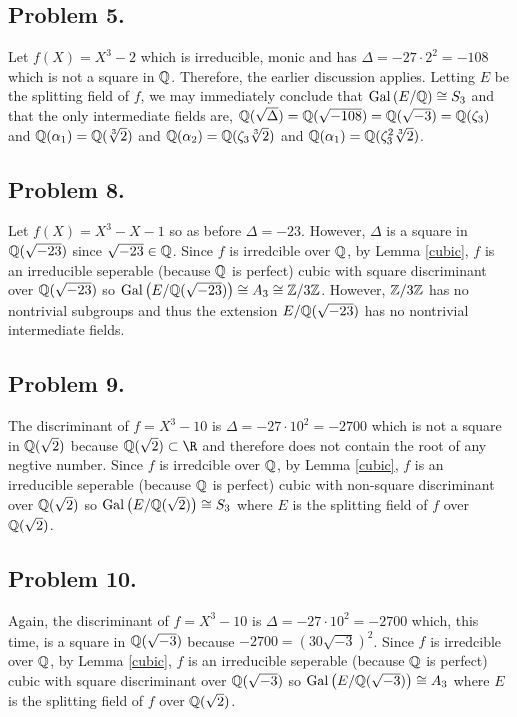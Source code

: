 \documentclass[12pt]{extarticle}
\begin{document}
 
\subsection*{Problem 5.}

Let $f(X) = X^3 - 2$ which is irreducible, monic and has $\Delta = -27 \cdot 2^2 = -108$ which is not a square in $\mathbb{Q}$. Therefore, the earlier discussion applies. Letting $E$ be the splitting field of $f$, we may immediately conclude that $\mathrm{Gal}\left( E/\mathbb{Q} \right) \cong S_3$ and that the only intermediate fields are, $\mathbb{Q}(\sqrt{\Delta}) = \mathbb{Q}(\sqrt{-108}) = \mathbb{Q}(\sqrt{-3}) = \mathbb{Q}(\zeta_3)$ and $\mathbb{Q}(\alpha_1) = \mathbb{Q}(\sqrt[3]{2})$ and $\mathbb{Q}(\alpha_2) = \mathbb{Q}(\zeta_3 \sqrt[3]{2})$ and $\mathbb{Q}(\alpha_1) = \mathbb{Q}(\zeta_3^2 \sqrt[3]{2})$.

\subsection*{Problem 8.}
Let $f(X) = X^3 - X - 1$ so as before $\Delta = -23$. However, $\Delta$ is a square in $\mathbb{Q}(\sqrt{-23})$ since $\sqrt{-23} \in \mathbb{Q}$. Since $f$ is irredcible over $\mathbb{Q}$, by Lemma \ref{cubic}, $f$ is an irreducible seperable (because $\mathbb{Q}$ is perfect) cubic with square discriminant over $\mathbb{Q}(\sqrt{-23})$ so $\mathrm{Gal}\left( E/\mathbb{Q}(\sqrt{-23}) \right) \cong A_3 \cong \mathbb{Z}/3\mathbb{Z}$. However, $\mathbb{Z}/3\mathbb{Z}$ has no nontrivial subgroups and thus the extension $E/\mathbb{Q}(\sqrt{-23})$ has no nontrivial intermediate fields.


\subsection*{Problem 9.}
The discriminant of $f = X^3 - 10$ is $\Delta = -27 \cdot 10^2 = -2700$ which is not a square in $\mathbb{Q}(\sqrt{2})$ because $\Q(\sqrt{2}) \subset \R$ and therefore does not contain the root of any negtive number. Since $f$ is irredcible over $\mathbb{Q}$, by Lemma \ref{cubic}, $f$ is an irreducible seperable (because $\mathbb{Q}$ is perfect) cubic with non-square discriminant over $\mathbb{Q}(\sqrt{2})$ so $\mathrm{Gal}\left( E/\mathbb{Q}(\sqrt{2}) \right) \cong S_3$ where $E$ is the splitting field of $f$ over $\mathbb{Q}(\sqrt{2})$. 

\subsection*{Problem 10.}
Again, the discriminant of $f = X^3 - 10$ is $\Delta = -27 \cdot 10^2 = -2700$ which, this time, is a square in $\mathbb{Q}(\sqrt{-3})$ because $-2700 = (30 \sqrt{-3})^2$. Since $f$ is irredcible over $\mathbb{Q}$, by Lemma \ref{cubic}, $f$ is an irreducible seperable (because $\mathbb{Q}$ is perfect) cubic with square discriminant over $\mathbb{Q}(\sqrt{-3})$ so $\mathrm{Gal}\left( E/\mathbb{Q}(\sqrt{-3}) \right) \cong A_3$ where $E$ is the splitting field of $f$ over $\mathbb{Q}(\sqrt{2})$. 
\end{document}
